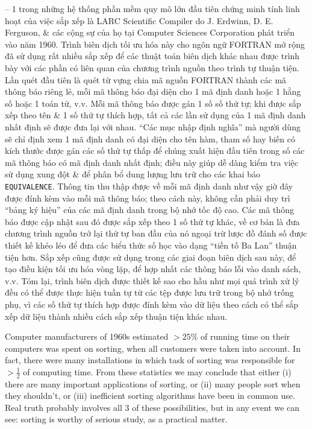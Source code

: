 \documentclass{article}
\begin{document}
\begin{itemize}
    -- 1 trong những hệ thống phần mềm quy mô lớn đầu tiên chứng minh tính linh hoạt của việc sắp xếp là LARC Scientific Compiler do {\sc J. Erdwinn, D. E. Ferguson}, \& các cộng sự của họ tại Computer Sciences Corporation phát triển vào năm 1960. Trình biên dịch tối ưu hóa này cho ngôn ngữ FORTRAN mở rộng đã sử dụng rất nhiều sắp xếp để các thuật toán biên dịch khác nhau được trình bày với các phần có liên quan của chương trình nguồn theo trình tự thuận tiện. Lần quét đầu tiên là quét từ vựng chia mã nguồn FORTRAN thành các mã thông báo riêng lẻ, mỗi mã thông báo đại diện cho 1 mã định danh hoặc 1 hằng số hoặc 1 toán tử, v.v. Mỗi mã thông báo được gán 1 số số thứ tự; khi được sắp xếp theo tên \& 1 số thứ tự thích hợp, tất cả các lần sử dụng của 1 mã định danh nhất định sẽ được đưa lại với nhau. ``Các mục nhập định nghĩa'' mà người dùng sẽ chỉ định xem 1 mã định danh có đại diện cho tên hàm, tham số hay biến có kích thước được gán các số thứ tự thấp để chúng xuất hiện đầu tiên trong số các mã thông báo có mã định danh nhất định; điều này giúp dễ dàng kiểm tra việc sử dụng xung đột \& để phân bổ dung lượng lưu trữ cho các khai báo {\tt EQUIVALENCE}. Thông tin thu thập được về mỗi mã định danh như vậy giờ đây được đính kèm vào mỗi mã thông báo; theo cách này, không cần phải duy trì ``bảng ký hiệu'' của các mã định danh trong bộ nhớ tốc độ cao. Các mã thông báo được cập nhật sau đó được sắp xếp theo 1 số thứ tự khác, về cơ bản là đưa chương trình nguồn trở lại thứ tự ban đầu của nó ngoại trừ lược đồ đánh số được thiết kế khéo léo để đưa các biểu thức số học vào dạng ``tiền tố Ba Lan'' thuận tiện hơn. Sắp xếp cũng được sử dụng trong các giai đoạn biên dịch sau này, để tạo điều kiện tối ưu hóa vòng lặp, để hợp nhất các thông báo lỗi vào danh sách, v.v. Tóm lại, trình biên dịch được thiết kế sao cho hầu như mọi quá trình xử lý đều có thể được thực hiện tuần tự từ các tệp được lưu trữ trong bộ nhớ trống phụ, vì các số thứ tự thích hợp được đính kèm vào dữ liệu theo cách có thể sắp xếp dữ liệu thành nhiều cách sắp xếp thuận tiện khác nhau.
    
    Computer manufacturers of 1960s estimated $> 25\%$ of running time on their computers was spent on sorting, when all customers were taken into account. In fact, there were many installations in which task of sorting was responsible for $> \frac{1}{2}$ of computing time. From these statistics we may conclude that either (i) there are many important applications of sorting, or (ii) many people sort when they shouldn't, or (iii) inefficient sorting algorithms have been in common use. Real truth probably involves all 3 of these possibilities, but in any event we can see: sorting is worthy of serious study, as a practical matter.
    

\end{itemize}
\end{document}
